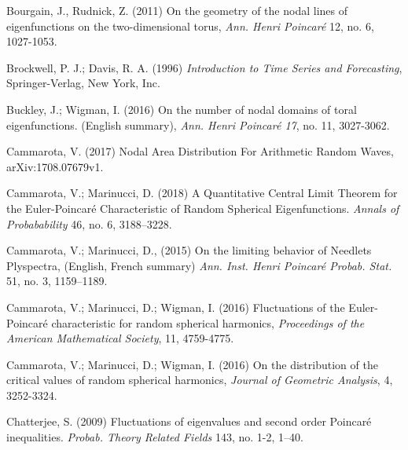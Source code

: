 \begin{thebibliography}{99}
	 Bourgain, J., Rudnick, Z. (2011) On the geometry of the nodal lines of eigenfunctions on the two-dimensional torus,\textit{ Ann.
		Henri Poincar\'e }12, no. 6, 1027-1053.
	
	 Brockwell, P. J.; Davis, R. A. (1996) \textit{Introduction to Time Series and Forecasting}, Springer-Verlag, New York, Inc.
	
	
	 Buckley, J.; Wigman, I. (2016)
	On the number of nodal domains of toral eigenfunctions. (English summary),
	\textit{Ann. Henri Poincar\'e 17}, no. 11, 3027-3062.
	
	
	
	 Cammarota, V. (2017) Nodal Area Distribution For Arithmetic Random
	Waves, arXiv:1708.07679v1.
	
	
	  Cammarota, V.; Marinucci, D. (2018) A Quantitative Central Limit Theorem for the Euler-Poincaré Characteristic of Random Spherical Eigenfunctions. \textit{Annals of Probabability }46, no. 6, 3188–3228.
	
	 Cammarota, V.; Marinucci, D., (2015) On the limiting behavior of Needlets Plyspectra, (English, French summary) 
	\textit{Ann. Inst. Henri Poincaré Probab. Stat.} 51, no. 3, 1159–1189. 
	
	 Cammarota, V.; Marinucci, D.; Wigman, I. (2016) Fluctuations of the Euler-Poincar\'e characteristic for random spherical harmonics,
	\textit{Proceedings of the American Mathematical Society}, 11, 4759-4775.
	
	
	
	 Cammarota, V.; Marinucci, D.; Wigman, I. (2016) On the distribution of the critical values of random spherical harmonics,
	\textit{Journal of Geometric Analysis}, 4, 3252-3324.
	
	
	 Chatterjee, S. (2009) Fluctuations of eigenvalues and second order Poincar\'e inequalities. \textit{Probab. Theory Related Fields} 143, no. 1-2, 1–40. 
	
	

\end{thebibliography}

